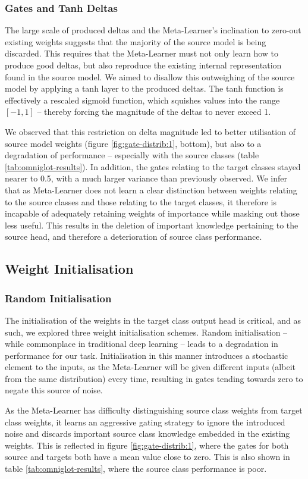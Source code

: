 \documentclass{report}
\begin{document}
\subsubsection{Gates and Tanh Deltas}
The large scale of produced deltas and the Meta-Learner's inclination to zero-out existing weights suggests that the majority of the source model is being discarded. This requires that the Meta-Learner must not only learn how to produce good deltas, but also reproduce the existing internal representation found in the source model. We aimed to disallow this outweighing of the source model by applying a tanh layer to the produced deltas. The tanh function is effectively a rescaled sigmoid function, which squishes values into the range $[-1, 1]$ -- thereby forcing the magnitude of the deltas to never exceed 1. \par
We observed that this restriction on delta magnitude led to better utilisation of source model weights (figure \ref{fig:gate-distrib:1}, bottom), but also to a degradation of performance -- especially with the source classes (table \ref{tab:omniglot-results}). In addition, the gates relating to the target classes stayed nearer to 0.5, with a much larger variance than previously observed. We infer that as Meta-Learner does not learn a clear distinction between weights relating to the source classes and those relating to the target classes, it therefore is incapable of adequately retaining weights of importance while masking out those less useful. This results in the deletion of important knowledge pertaining to the source head, and therefore a deterioration of source class performance.

\subsection{Weight Initialisation}
\subsubsection{Random Initialisation}
The initialisation of the weights in the target class output head is critical, and as such, we explored three weight initialisation schemes. Random initialisation -- while commonplace in traditional deep learning -- leads to a degradation in performance for our task. Initialisation in this manner introduces a stochastic element to the inputs, as the Meta-Learner will be given different inputs (albeit from the same distribution) every time, resulting in gates tending towards zero to negate this source of noise. \par
As the Meta-Learner has difficulty distinguishing source class weights from target class weights, it learns an aggressive gating strategy to ignore the introduced noise and discards important source class knowledge embedded in the existing weights. This is reflected in figure \ref{fig:gate-distrib:1}, where the gates for both source and targets both have a mean value close to zero. This is also shown in table \ref{tab:omniglot-results}, where the source class performance is poor.
\end{document}
